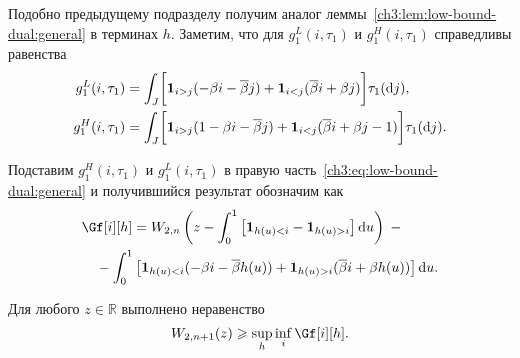 {Подобно предыдущему подразделу получим аналог леммы~\ref{ch3:lem:low-bound-dual:general} в терминах $h$.
Заметим, что для $g_1^L(i, \tau_1)$ и $g_1^H(i, \tau_1)$ справедливы равенства
\begin{align*}
  g_1^L(i,\tau_1) &=
                      \int_J \biggl[
                      \mathbf{1}_{i>j} (-\beta i - {{\overline{\beta}}} j) +
                      \mathbf{1}_{i<j} ({{\overline{\beta}}} i + \beta j)
                      \biggr] \tau_1(\mathop{}\!\mathrm{d} j),\\
  g_1^H(i,\tau_1) &=
                      \int_J \biggl[
                      \mathbf{1}_{i>j} (1 -\beta i - {{\overline{\beta}}} j) +
                      \mathbf{1}_{i<j} ({{\overline{\beta}}} i + \beta j - 1)
                      \biggr] \tau_1(\mathop{}\!\mathrm{d} j).
\end{align*}

Подставим $g_1^H(i, \tau_1)$ и $g_1^L(i,\tau_1)$ в правую часть~\eqref{ch3:eq:low-bound-dual:general} и получившийся результат обозначим как
\begin{equation}\label{eq:W-low-bound:parameterized}
\begin{multlined}
  \Gf[i][h] =
  W_{2,n}\left( 
    z - \int_0^1 \left[ \Ind{h(u) < i} - \Ind{h(u) > i} \right] \di u
  \right) \; - \\
  - \int_0^1 \left[ 
    \Ind{h(u) < i} (-\Co i - \DCo h(u)) + 
    \Ind{h(u) > i} (\DCo i + \Co h(u)) 
  \right] \di u.
\end{multlined}
\end{equation}

\begin{lemma}\label{ch3:lem:W-low-bound:parameterized}
  Для любого $z \in \mathbb{R}$ выполнено неравенство
  \begin{equation*}
    W_{2,n+1}(z) \geqslant \sup_h \inf_{i} \Gf[i][h].
  \end{equation*}
\end{lemma}

}
